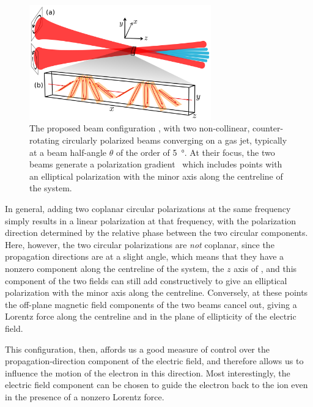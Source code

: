 \begin{figure}[htb]
  \centering
  \subfloat{\label{f8-field-configuration-beams}}
  \subfloat{\label{f8-field-configuration-ellipses}}
  \includegraphics[width=0.7\textwidth]{9-Nondipole-HHG/Figures/figure9B.png} 
  \caption[
  Proposed beam configuration for probing the Lorentz-force action: two non-collinear, counter-rotating circularly polarized beams of the same frequency, with the resulting field configuration showing forwards ellipticity
  ]{
  The proposed beam configuration \protect{}, with two non-collinear, counter-rotating circularly polarized beams converging on a gas jet, typically at a beam half-angle $\theta$ of the order of \SI{5}{\degree}. At their focus, the two beams generate a polarization gradient~\protect{} which includes points with an elliptical polarization with the minor axis along the centreline of the system.
  }
\label{f8-field-configuration}
\end{figure}



In general, adding two coplanar circular polarizations at the same frequency simply results in a linear polarization at that frequency, with the polarization direction determined by the relative phase between the two circular components. Here, however, the two circular polarizations are \textit{not} coplanar, since the propagation directions are at a slight angle, which means that they have a nonzero component along the centreline of the system, the $z$ axis of , and this component of the two fields can still add constructively to give an elliptical polarization with the minor axis along the centreline. Conversely, at these points the off-plane magnetic field components of the two beams cancel out, giving a Lorentz force along the centreline and in the plane of ellipticity of the electric field.

This configuration, then, affords us a good measure of control over the propagation-direction component of the electric field, and therefore allows us to influence the motion of the electron in this direction. Most interestingly, the electric field component can be chosen to guide the electron back to the ion even in the presence of a nonzero Lorentz force.

